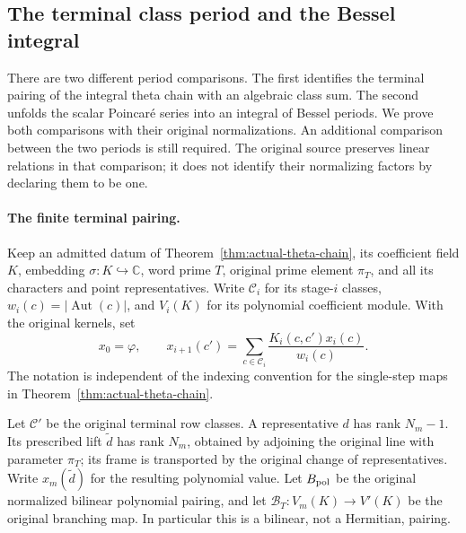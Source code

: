 \subsection{The terminal class period and the Bessel integral}
\label{sec:actual-theta-period-comparison}

There are two different period comparisons. The first identifies the
terminal pairing of the integral theta chain with an algebraic class
sum. The second unfolds the scalar Poincar\'e series into an integral
of Bessel periods. We prove both comparisons with their original
normalizations. An additional comparison between the two periods is
still required. The original source preserves linear relations in that
comparison; it does not identify their normalizing factors by declaring
them to be one.\cite{theta-period-source}

\paragraph{The finite terminal pairing.}
Keep an admitted datum of Theorem~\ref{thm:actual-theta-chain}, its
coefficient field $K$, embedding $\sigma:K\hookrightarrow\mathbb C$,
word prime $T$, original prime element $\pi_T$, and all its characters
and point representatives. Write $\mathcal C_i$ for its stage-$i$
classes, $w_i(c)=|\operatorname{Aut}(c)|$, and $V_i(K)$ for its
polynomial coefficient module. With the original kernels, set
\[
 x_0=\varphi,\qquad
 x_{i+1}(c')=\sum_{c\in\mathcal C_i}
                 \frac{K_i(c,c')x_i(c)}{w_i(c)}.
 \tag{TP1}
\]
The notation is independent of the indexing convention for the
single-step maps in Theorem~\ref{thm:actual-theta-chain}.

Let $\mathcal C'$ be the original terminal row classes. A representative
$d$ has rank $N_m-1$. Its prescribed lift $\widetilde d$ has rank
$N_m$, obtained by adjoining the original line with parameter $\pi_T$;
its frame is transported by the original change of representatives.
Write $x_m(\widetilde d)$ for the resulting polynomial value. Let
$B_{\rm pol}$ be the original normalized bilinear polynomial pairing,
and let $\mathcal B_T:V_m(K)\to V'(K)$ be the original branching map.
In particular this is a bilinear, not a Hermitian, pairing.

